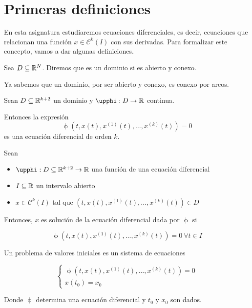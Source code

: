 
\section{Primeras definiciones}

En esta asignatura estudiaremos ecuaciones diferenciales, es decir, ecuaciones que relacionan una función $x \in \mathcal{C}^k(I)$
con sus derivadas. Para formalizar este concepto, vamos a dar algunas definiciones.

\begin{ndef}[Dominio]
  Sea $D \subseteq \mathbb{R}^N$. Diremos que es un dominio si es abierto y conexo.
\end{ndef}

Ya sabemos que un dominio, por ser abierto y conexo, es conexo por arcos.

\begin{ndef}
  Sean $D \subseteq \mathbb{R}^{k+2}$ un dominio y $\upphi : D \to \R$ continua.

  Entonces la expresión
  \[\upphi\left(t, x(t), x^{(1)}(t), \dots, x^{(k)}(t)\right) = 0\]
  es una ecuación diferencial de orden $k$.
\end{ndef}


\begin{ndef}
  Sean 
  \begin{itemize}
  \item $\upphi : D \subseteq \R^{k+2} \to \R$ una función de una ecuación diferencial
  \item $I \subseteq \mathbb{R}$ un intervalo abierto
  \item $x \in \mathcal{C}^k(I)$ tal que $(t, x(t), x^{(1)}(t), \dots, x^{(k)}(t)) \in D$
  \end{itemize}

  Entonces, $x$ es solución de la ecuación diferencial dada por $\upphi$ si

  \[
    \upphi(t, x(t), x^{(1)}(t), \dots, x^{(k)}(t)) = 0 \ \forall t \in I
  \]
\end{ndef}

\begin{ndef}
  Un problema de valores iniciales es un sistema de ecuaciones

  \[
  \begin{cases}
    \upphi\left(t, x(t), x^{(1)}(t), \dots, x^{(k)}(t)\right) = 0 \\
    x(t_0) = x_0
  \end{cases}
  \]

  Donde $\upphi$ determina una ecuación diferencial y $t_0$ y $x_0$ son dados.
\end{ndef}

